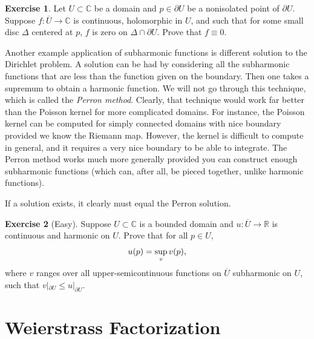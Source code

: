 \documentclass[12pt,openany]{book}
\newcommand{\widebar}[1]{\overline{#1}}
\newcommand{\avoidbreak}{\postdisplaypenalty=100}
\newcommand{\C}{{\mathbb{C}}}
\newcommand{\R}{{\mathbb{R}}}
\newcommand{\myindex}[1]{#1\index{#1}}
\theoremstyle{plain}
\theoremstyle{remark}
\theoremstyle{definition}
\newenvironment{exbox}{%
    \def\FrameCommand{\vrule width 1pt \relax\hspace{10pt}}%
    \MakeFramed{\advance\hsize-\width\FrameRestore}%
}{%
    \endMakeFramed
}
\theoremstyle{exercise}
\newtheorem{exercise}{Exercise}[section]
\theoremstyle{example}
\begin{document}
\begin{exbox}
\begin{exercise}
Let $U \subset \C$ be a domain and $p \in \partial U$ be a nonisolated point
of $\partial U$.  Suppose $f \colon \widebar{U} \to \C$ is continuous,
holomorphic in $U$, and such that for some small disc $\Delta$ centered at
$p$, $f$ is zero on $\Delta \cap \partial U$.  Prove that $f \equiv 0$.
\end{exercise}
\end{exbox}

Another example application of subharmonic functions is different solution
to the Dirichlet problem.  A solution can be had by considering all the
subharmonic functions that are less than the function given on the boundary.
Then one takes a supremum to obtain a harmonic function.  We will not go
through this technique, which is called the \emph{\myindex{Perron method}}.
Clearly, that technique would work far better than the Poisson kernel for
more complicated domains.  For instance, the Poisson kernel can be computed
for simply connected domains with nice boundary provided we know the Riemann map.  However,
the kernel is difficult to compute in general, and it requires a very nice
boundary to be able to integrate.  The Perron method works much more
generally provided you can construct enough subharmonic functions (which
can, after all, be pieced together, unlike harmonic functions).

If a solution exists, it clearly must equal the Perron solution.

\begin{exbox}
\begin{exercise}[Easy]
\pagebreak[2]
Suppose $U \subset \C$ is a bounded domain and
$u \colon \widebar{U} \to \R$ is continuous and
harmonic on $U$.  Prove that for all $p \in U$,
\begin{equation*}
u(p) = \sup_{v} v(p),
\avoidbreak
\end{equation*}
where $v$ ranges over all upper-semicontinuous functions on $\widebar{U}$
subharmonic on $U$,
such that $v|_{\partial U} \leq u|_{\partial U}$.
\end{exercise}
\end{exbox}


\chapter{Weierstrass Factorization} \label{ch:weier}
\end{document}
